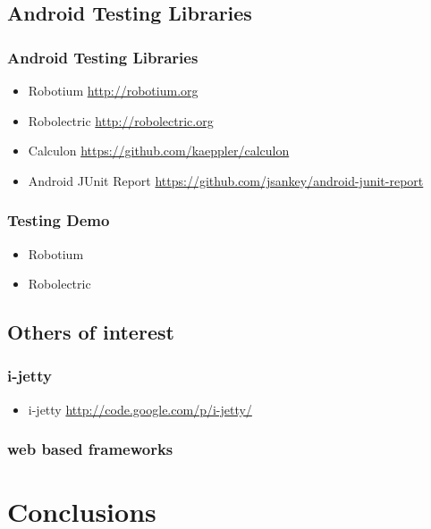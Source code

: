 \documentclass{beamer}
\begin{document}
  \subsection{Android Testing Libraries}

    \begin{frame}
      \frametitle{Android Testing Libraries}
      \begin{itemize}
        \item<1->Robotium \url{http://robotium.org}
        \item<2->Robolectric \url{http://robolectric.org}
        \item<3->Calculon \url{https://github.com/kaeppler/calculon}
        \item<4->Android JUnit Report \url{https://github.com/jsankey/android-junit-report}
      \end{itemize}
    \end{frame}

    \begin{frame}
     \frametitle{Testing Demo}
      \begin{itemize}
       \item Robotium
        \item Robolectric
      \end{itemize}

    \end{frame}



  \subsection{Others of interest}  

    \begin{frame}
      \frametitle{i-jetty}
      \begin{itemize}
       \item i-jetty \url{http://code.google.com/p/i-jetty/}
      \end{itemize}

    \end{frame}

    \begin{frame}
      \frametitle{web based frameworks}
    \end{frame}

\section{Conclusions}
\end{document}
